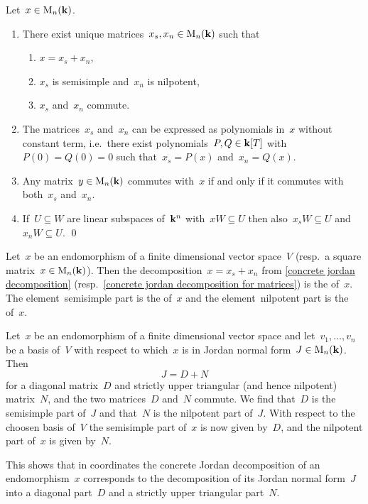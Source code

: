 \begin{corollary}
  \label{concrete jordan decomposition for matrices}
  Let~$x \in \operatorname{M}_n(\mathbf{k})$.
  \begin{enumerate}
    \item
      There exist unique matrices~$x_s, x_n \in \operatorname{M}_n(\mathbf{k})$ such that
      \begin{enumerate}
        \item
          $x = x_s + x_n$,
        \item
          $x_s$ is semisimple and~$x_n$ is nilpotent,
        \item
          $x_s$ and~$x_n$ commute.
      \end{enumerate}
    \item
      The matrices~$x_s$ and~$x_n$ can be expressed as polynomials in~$x$ without constant term, i.e.\ there exist polynomials~$P,Q \in \mathbf{k}[T]$ with~$P(0) = Q(0) = 0$ such that~$x_s = P(x)$ and~$x_n = Q(x)$.
    \item
      Any matrix~$y \in \operatorname{M}_n(\mathbf{k})$ commutes with~$x$ if and only if it commutes with both~$x_s$ and~$x_n$.
    \item
      If~$U \subseteq W$ are linear subspaces of~$\mathbf{k}^n$ with~$x W \subseteq U$ then also~$x_s W \subseteq U$ and~$x_n W \subseteq U$.
    \qed
  \end{enumerate}
\end{corollary}


\begin{definition}
  Let~$x$ be an endomorphism of a finite dimensional vector space~$V$ (resp.\ a square matrix~$x \in \operatorname{M}_n(\mathbf{k})$).
  Then the decomposition~$x = x_s + x_n$ from \cref{concrete jordan decomposition} (resp.\ \cref{concrete jordan decomposition for matrices}) is the  of~$x$.
  The element~\gls*{semisimple part} is the  of~$x$ and the element~\gls*{nilpotent part} is the  of~$x$.
\end{definition}


\begin{example}
  \label{computation of jd via jnf}
  Let~$x$ be an endomorphism of a finite dimensional vector space and let~$v_1, \dotsc, v_n$ be a basis of~$V$ with respect to which~$x$ is in Jordan normal form~$J \in \operatorname{M}_n(\mathbf{k})$.
  Then
  \[
    J
    =
    D + N
  \]
  for a diagonal matrix~$D$ and strictly upper triangular (and hence nilpotent) matrix~$N$, and the two matrices~$D$ and~$N$ commute.
  We find that~$D$ is the semisimple part of~$J$ and that~$N$ is the nilpotent part of~$J$.
  With respect to the choosen basis of~$V$ the semisimple part of~$x$ is now given by~$D$, and the nilpotent part of~$x$ is given by~$N$.
  
  This shows that in coordinates the concrete Jordan decomposition of an endomorphism~$x$ corresponds to the decomposition of its Jordan normal form~$J$ into a diagonal part~$D$ and a strictly upper triangular part~$N$.
\end{example}


